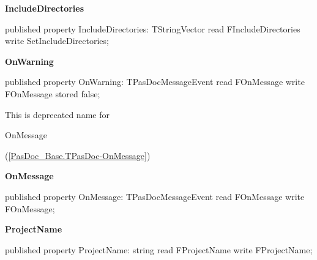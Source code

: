 \documentclass{report}
\newif\ifpdf
\begin{document}
\begin{list}{}
\par  \label{PasDoc_Base.TPasDoc-IncludeDirectories}
\item[\textbf{IncludeDirectories}\hfill]
\ifpdf
\begin{flushleft}
\fi
\begin{ttfamily}
published property IncludeDirectories: TStringVector read FIncludeDirectories write
      SetIncludeDirectories;\end{ttfamily}

\ifpdf
\end{flushleft}
\fi


\par  \label{PasDoc_Base.TPasDoc-OnWarning}
\item[\textbf{OnWarning}\hfill]
\ifpdf
\begin{flushleft}
\fi
\begin{ttfamily}
published property OnWarning: TPasDocMessageEvent read FOnMessage write FOnMessage stored false;\end{ttfamily}

\ifpdf
\end{flushleft}
\fi


\par This is deprecated name for \begin{ttfamily}OnMessage\end{ttfamily}(\ref{PasDoc_Base.TPasDoc-OnMessage})\label{PasDoc_Base.TPasDoc-OnMessage}
\item[\textbf{OnMessage}\hfill]
\ifpdf
\begin{flushleft}
\fi
\begin{ttfamily}
published property OnMessage: TPasDocMessageEvent read FOnMessage write FOnMessage;\end{ttfamily}

\ifpdf
\end{flushleft}
\fi


\par  \label{PasDoc_Base.TPasDoc-ProjectName}
\item[\textbf{ProjectName}\hfill]
\ifpdf
\begin{flushleft}
\fi
\begin{ttfamily}
published property ProjectName: string read FProjectName write FProjectName;\end{ttfamily}

\ifpdf
\end{flushleft}
\fi



\end{list}
\end{document}
